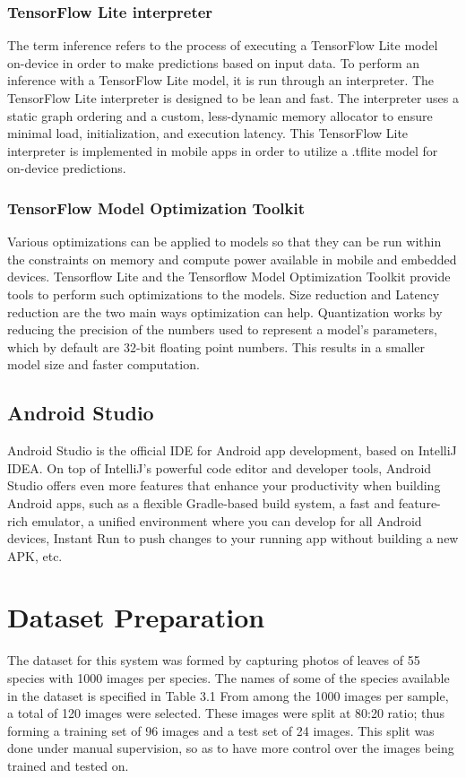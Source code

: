 \subsubsection{TensorFlow Lite interpreter}
The term inference refers to the process of executing a TensorFlow Lite model on-device in order to make predictions based on input data. To perform an inference with a TensorFlow Lite model, it is run through an interpreter. The TensorFlow Lite interpreter is designed to be lean and fast. The interpreter uses a static graph ordering and a custom, less-dynamic memory allocator to ensure minimal load, initialization, and execution latency. This TensorFlow Lite interpreter is implemented in mobile apps in order to utilize a .tflite model for on-device predictions.

\subsubsection{TensorFlow Model Optimization Toolkit}
Various optimizations can be applied to models so that they can be run within the constraints on memory and compute power available in mobile and embedded devices. Tensorflow Lite and the Tensorflow Model Optimization Toolkit provide tools to perform such optimizations to the models. Size reduction and Latency reduction are the two main ways optimization can help. Quantization works by reducing the precision of the numbers used to represent a model's parameters, which by default are 32-bit floating point numbers. This results in a smaller model size and faster computation.

\subsection{Android Studio}
Android Studio is the official IDE for Android app development, based on IntelliJ IDEA. On top of IntelliJ’s powerful code editor and developer tools, Android Studio offers even more features that enhance your productivity when building Android apps, such as a flexible Gradle-based build system, a fast and feature-rich emulator, a unified environment where you can develop for all Android devices, Instant Run to push changes to your running app without building a new APK, etc.

\section{Dataset Preparation}
The dataset for this system was formed by capturing photos of leaves of 55 species with 1000 images per species. The names of some of the species available in the dataset is specified in Table 3.1 From among the 1000 images per sample, a total of 120 images were selected. These images were split at 80:20 ratio; thus forming a training set of 96 images and a test set of 24 images. This split was done under manual supervision, so as to have more control over the images being trained and tested on.

